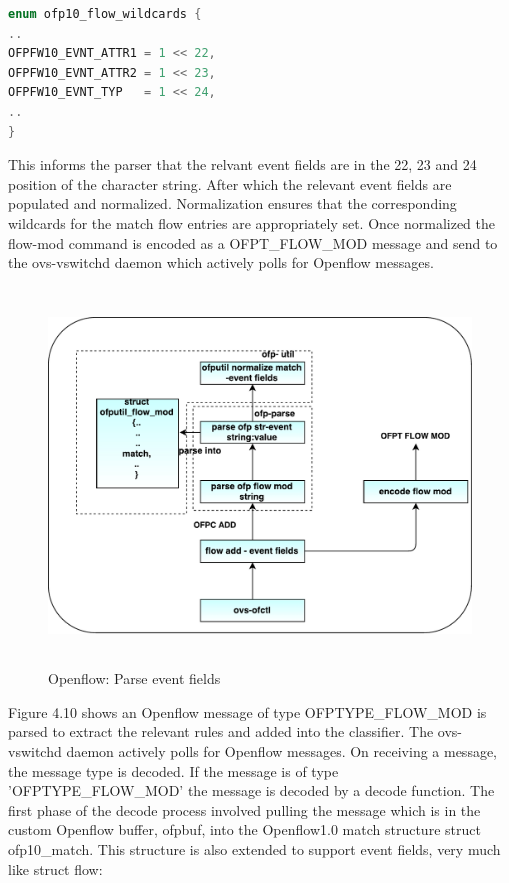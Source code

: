 \begin{lstlisting}[language=c]
enum ofp10_flow_wildcards {
..
OFPFW10_EVNT_ATTR1 = 1 << 22,
OFPFW10_EVNT_ATTR2 = 1 << 23,
OFPFW10_EVNT_TYP   = 1 << 24,
..
}
\end{lstlisting}
This informs the parser that the relvant event fields are in the 22, 23 and 24 position of the character string. After which the relevant event fields are populated and normalized. Normalization ensures that the corresponding wildcards for the match flow entries are appropriately set. Once normalized the flow-mod command is encoded as a OFPT_FLOW_MOD message and send to the ovs-vswitchd daemon which actively polls for Openflow messages.

\begin{figure}[H]
	\centering
	\caption{Openflow: Parse event fields}
	\includegraphics[height=10cm,width=14cm]{flowadd.pdf}
\end{figure}

Figure 4.10 shows an Openflow message of type OFPTYPE_FLOW_MOD is parsed to extract the relevant rules and added into the classifier. The ovs-vswitchd daemon actively polls for Openflow messages. On receiving a message, the message type is decoded. If the message is of type 'OFPTYPE_FLOW_MOD' the message is decoded by a decode function. The first phase of the decode process involved pulling the message which is in the custom Openflow buffer, ofpbuf, into the Openflow1.0 match structure struct ofp10_match. This structure is also extended to support event fields, very much like struct flow: \newline

